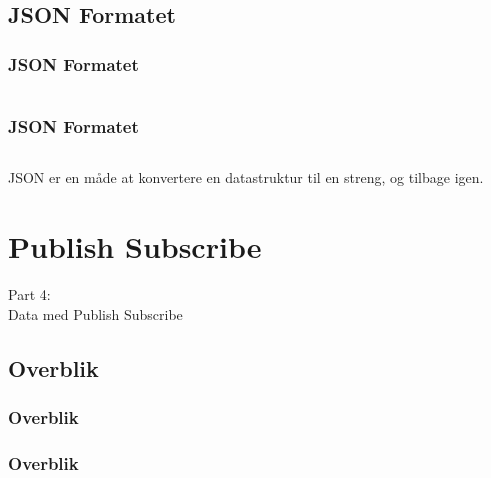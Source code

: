 \subsection{JSON Formatet}
\begin{frame}
    \frametitle{JSON Formatet}
    \vspace{-1mm}
    \inputminted[fontsize=\footnotesize]{javascript}{../src/frontend/part3_object/logic.js}
\end{frame}
\begin{frame}
    \frametitle{JSON Formatet}
    \vspace{-1mm}
    \inputminted[fontsize=\footnotesize,highlightlines={1}]{javascript}{../src/frontend/part3_json/logic.js}
    
    \pause
    \vspace{1mm}
    JSON er en måde at konvertere en datastruktur til en streng, og tilbage igen.
\end{frame}

\section{Publish Subscribe}
\begin{frame}
    \vspace{25mm}
    \begin{center}
        \Huge{Part 4:\\Data med Publish Subscribe}
    \end{center}
\end{frame}

\subsection{Overblik}
\begin{frame}
    \frametitle{Overblik}
    \vspace{10mm}
    \begin{center}
    \end{center}
\end{frame}
\begin{frame}
    \frametitle{Overblik}
    \vspace{10mm}
    \begin{center}
    \end{center}
\end{frame}

